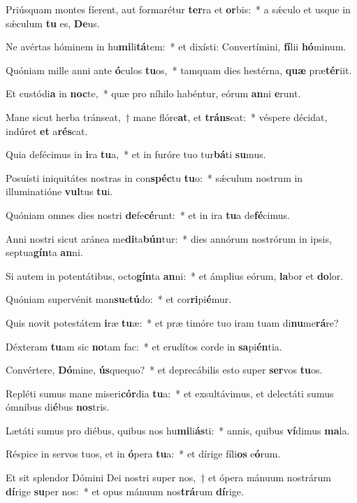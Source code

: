 \item Priúsquam montes fíerent, aut formarétur \textbf{ter}ra et \textbf{or}bis:~* a sǽculo et usque in sǽculum \textbf{tu} es, \textbf{De}us.
\item Ne avértas hóminem in hu\textbf{mi}li\textbf{tá}tem:~* et dixísti: Convertímini, \textbf{fí}lii \textbf{hó}minum.
\item Quóniam mille anni ante \textbf{ó}culos \textbf{tu}os,~* tamquam dies hestérna, \textbf{quæ} præ\textbf{tér}iit.
\item Et custódi\textbf{a} in \textbf{noc}te,~* quæ pro níhilo habéntur, eórum \textbf{an}ni \textbf{e}runt.
\item Mane sicut herba tránseat,~† mane flóre\textbf{at}, et \textbf{tráns}eat:~* véspere décidat, indúret \textbf{et} a\textbf{rés}cat.
\item Quia defécimus in \textbf{i}ra \textbf{tu}a,~* et in furóre tuo tur\textbf{bá}ti \textbf{su}mus.
\item Posuísti iniquitátes nostras in con\textbf{spéc}tu \textbf{tu}o:~* sǽculum nostrum in illuminatióne \textbf{vul}tus \textbf{tu}i.
\item Quóniam omnes dies nostri \textbf{de}fe\textbf{cé}runt:~* et in ira \textbf{tu}a de\textbf{fé}cimus.
\item Anni nostri sicut aránea me\textbf{di}ta\textbf{bún}tur:~* dies annórum nostrórum in ipsis, septua\textbf{gín}ta \textbf{an}ni.
\item Si autem in potentátibus, octo\textbf{gín}ta \textbf{an}ni:~* et ámplius eórum, \textbf{la}bor et \textbf{do}lor.
\item Quóniam supervénit man\textbf{su}e\textbf{tú}do:~* et cor\textbf{ri}pi\textbf{é}mur.
\item Quis novit potestátem \textbf{i}ræ \textbf{tu}æ:~* et præ timóre tuo iram tuam di\textbf{nu}me\textbf{rá}re?
\item Déxteram \textbf{tu}am sic \textbf{no}tam fac:~* et erudítos corde in \textbf{sa}pi\textbf{én}tia.
\item Convértere, \textbf{Dó}mine, \textbf{ús}quequo?~* et deprecábilis esto super \textbf{ser}vos \textbf{tu}os.
\item Repléti sumus mane miseri\textbf{cór}dia \textbf{tu}a:~* et exsultávimus, et delectáti sumus ómnibus di\textbf{é}bus \textbf{nos}tris.
\item Lætáti sumus pro diébus, quibus nos hu\textbf{mi}li\textbf{ás}ti:~* annis, quibus \textbf{ví}dimus \textbf{ma}la.
\item Réspice in servos tuos, et in \textbf{ó}pera \textbf{tu}a:~* et dírige fíli\textbf{os} e\textbf{ó}rum.
\item Et sit splendor Dómini Dei nostri super nos,~† et ópera mánuum nostrárum \textbf{dí}rige \textbf{su}per nos:~* et opus mánuum nos\textbf{trá}rum \textbf{dí}rige.
